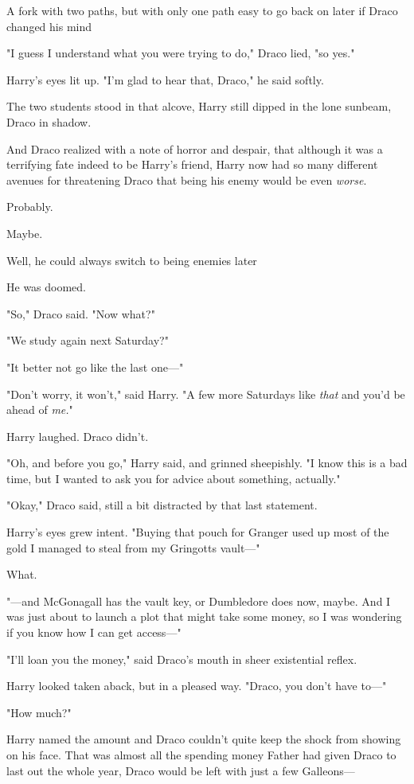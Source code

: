 A fork with two paths, but with only one path easy to go back on later if Draco
changed his mind{\el}

"I guess I understand what you were trying to do," Draco lied, "so yes."

Harry's eyes lit up. "I'm glad to hear that, Draco," he said softly.

The two students stood in that alcove, Harry still dipped in the lone sunbeam,
Draco in shadow.

And Draco realized with a note of horror and despair, that although it was a
terrifying fate indeed to be Harry's friend, Harry now had so many different
avenues for threatening Draco that being his enemy would be even \emph{worse}.

Probably.

Maybe.

Well, he could always switch to being enemies later{\el}

He was doomed.

"So," Draco said. "Now what?"

"We study again next Saturday?"

"It better not go like the last one\mbox{---}"

"Don't worry, it won't," said Harry. "A few more Saturdays like \emph{that} and
you'd be ahead of \emph{me.}"

Harry laughed. Draco didn't.

"Oh, and before you go," Harry said, and grinned sheepishly. "I know this is a
bad time, but I wanted to ask you for advice about something, actually."

"Okay," Draco said, still a bit distracted by that last statement.

Harry's eyes grew intent. "Buying that pouch for Granger used up most of the
gold I managed to steal from my Gringotts vault\mbox{---}"

What.

"---and McGonagall has the vault key, or Dumbledore does now, maybe. And I was
just about to launch a plot that might take some money, so I was wondering if
you know how I can get access\mbox{---}"

"I'll loan you the money," said Draco's mouth in sheer existential reflex.

Harry looked taken aback, but in a pleased way. "Draco, you don't have to\mbox{---}"

"How much?"

Harry named the amount and Draco couldn't quite keep the shock from showing on
his face. That was almost all the spending money Father had given Draco to last
out the whole year, Draco would be left with just a few Galleons\mbox{---}

